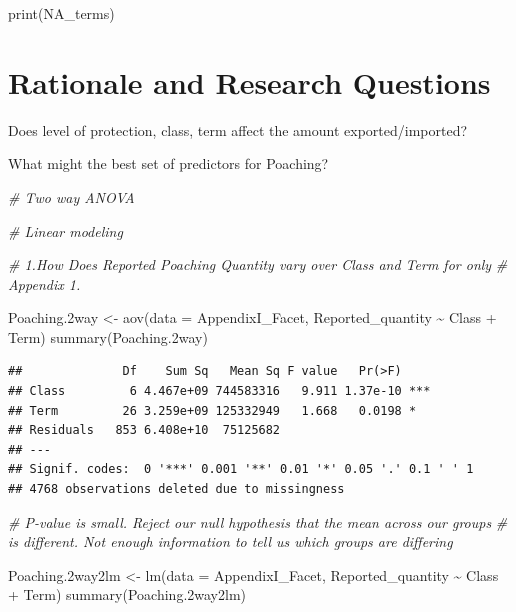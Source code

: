 \documentclass[
  12pt,
]{article}
\newenvironment{Shaded}{\begin{snugshade}}{\end{snugshade}}
\newcommand{\AttributeTok}[1]{\textcolor[rgb]{0.77,0.63,0.00}{#1}}
\newcommand{\CommentTok}[1]{\textcolor[rgb]{0.56,0.35,0.01}{\textit{#1}}}
\newcommand{\FloatTok}[1]{\textcolor[rgb]{0.00,0.00,0.81}{#1}}
\newcommand{\FunctionTok}[1]{\textcolor[rgb]{0.00,0.00,0.00}{#1}}
\newcommand{\NormalTok}[1]{#1}
\newcommand{\OtherTok}[1]{\textcolor[rgb]{0.56,0.35,0.01}{#1}}
\newcommand{\SpecialCharTok}[1]{\textcolor[rgb]{0.00,0.00,0.00}{#1}}
\begin{document}
\begin{Shaded}
\begin{Highlighting}[]
\FunctionTok{print}\NormalTok{(NA\_terms)}
\end{Highlighting}
\end{Shaded}

\hypertarget{rationale-and-research-questions}{%
\section{Rationale and Research
Questions}\label{rationale-and-research-questions}}

Does level of protection, class, term affect the amount
exported/imported?

What might the best set of predictors for Poaching?

\begin{Shaded}
\begin{Highlighting}[]
\CommentTok{\# Two way ANOVA}


\CommentTok{\# Linear modeling}

\CommentTok{\# 1.How Does Reported Poaching Quantity vary over Class and Term for only}
\CommentTok{\# Appendix 1.}

\NormalTok{Poaching}\FloatTok{.2}\NormalTok{way }\OtherTok{\textless{}{-}} \FunctionTok{aov}\NormalTok{(}\AttributeTok{data =}\NormalTok{ AppendixI\_Facet, Reported\_quantity }\SpecialCharTok{\textasciitilde{}}\NormalTok{ Class }\SpecialCharTok{+}\NormalTok{ Term)}
\FunctionTok{summary}\NormalTok{(Poaching}\FloatTok{.2}\NormalTok{way)}
\end{Highlighting}
\end{Shaded}

\begin{verbatim}
##              Df    Sum Sq   Mean Sq F value   Pr(>F)    
## Class         6 4.467e+09 744583316   9.911 1.37e-10 ***
## Term         26 3.259e+09 125332949   1.668   0.0198 *  
## Residuals   853 6.408e+10  75125682                     
## ---
## Signif. codes:  0 '***' 0.001 '**' 0.01 '*' 0.05 '.' 0.1 ' ' 1
## 4768 observations deleted due to missingness
\end{verbatim}

\begin{Shaded}
\begin{Highlighting}[]
\CommentTok{\# P{-}value is small. Reject our null hypothesis that the mean across our groups}
\CommentTok{\# is different.  Not enough information to tell us which groups are differing}

\NormalTok{Poaching}\FloatTok{.2}\NormalTok{way2lm }\OtherTok{\textless{}{-}} \FunctionTok{lm}\NormalTok{(}\AttributeTok{data =}\NormalTok{ AppendixI\_Facet, Reported\_quantity }\SpecialCharTok{\textasciitilde{}}\NormalTok{ Class }\SpecialCharTok{+}\NormalTok{ Term)}
\FunctionTok{summary}\NormalTok{(Poaching}\FloatTok{.2}\NormalTok{way2lm)}
\end{Highlighting}
\end{Shaded}
\end{document}
